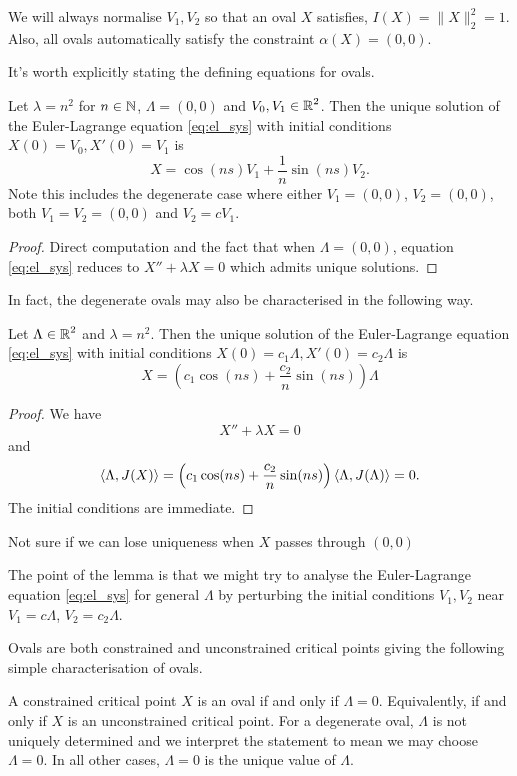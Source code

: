 \documentclass[12pt]{article}
\begin{document}
We will always normalise \(V_1, V_2\) so that an oval \(X\) satisfies, \(I(X) = \|X\|_2^2 = 1\). Also, all ovals automatically satisfy the constraint \(\alpha(X) = (0, 0)\).

It's worth explicitly stating the defining equations for ovals.

\begin{lem}
Let \(\lambda = n^2\) for \(n \in \operatorname{\mathbb{N}}\), \(\Lambda = (0, 0)\) and \(V_0, V_1 \in \operatorname{\mathbb{R}}^2\). Then the unique solution of the Euler-Lagrange equation \eqref{eq:el_sys} with initial conditions \(X(0) = V_0, X'(0) = V_1\) is
\[
X = \cos (ns) V_1 + \frac{1}{n} \sin(ns) V_2.
\]
Note this includes the degenerate case where either \(V_1 = (0, 0)\), \(V_2 = (0, 0)\), both \(V_1 = V_2 = (0, 0)\) and \(V_2 = cV_1\).
\end{lem}

\begin{proof}
Direct computation and the fact that when \(\Lambda = (0, 0)\), equation \eqref{eq:el_sys} reduces to \(X'' + \lambda X = 0\) which admits unique solutions.
\end{proof}

In fact, the degenerate ovals may also be characterised in the following way.

\begin{lem}
Let \(\Lambda \in \operatorname{\mathbb{R}}^2\) and \(\lambda = n^2\). Then the unique solution of the Euler-Lagrange equation \eqref{eq:el_sys} with initial conditions \(X(0) = c_1 \Lambda, X'(0) = c_2 \Lambda\) is
\[
X = \left(c_1 \cos (ns) + \frac{c_2}{n} \sin(ns)\right) \Lambda
\]
\end{lem}

\begin{proof}
We have
\[
X'' + \lambda X = 0
\]
and
\[
\left\langle{\Lambda},{J(X)}\right\rangle = \left(c_1 \cos (ns) + \frac{c_2}{n} \sin(ns)\right) \left\langle{\Lambda},{J(\Lambda)}\right\rangle = 0.
\]
The initial conditions are immediate.
\end{proof}

{\color{red}Not sure if we can lose uniqueness when \(X\) passes through \((0, 0)\)}

The point of the lemma is that we might try to analyse the Euler-Lagrange equation \eqref{eq:el_sys} for general \(\Lambda\) by perturbing the initial conditions \(V_1, V_2\) near \(V_1 = c\Lambda\), \(V_2 = c_2 \Lambda\).

Ovals are both constrained and unconstrained critical points giving the following simple characterisation of ovals.

\begin{lem}
\label{lem:ovalLambda}
A constrained critical point \(X\) is an oval if and only if \(\Lambda = 0\). Equivalently, if and only if \(X\) is an unconstrained critical point. For a degenerate oval, \(\Lambda\) is not uniquely determined and we interpret the statement to mean we may choose \(\Lambda = 0\). In all other cases, \(\Lambda = 0\) is the unique value of \(\Lambda\).
\end{lem}
\end{document}
